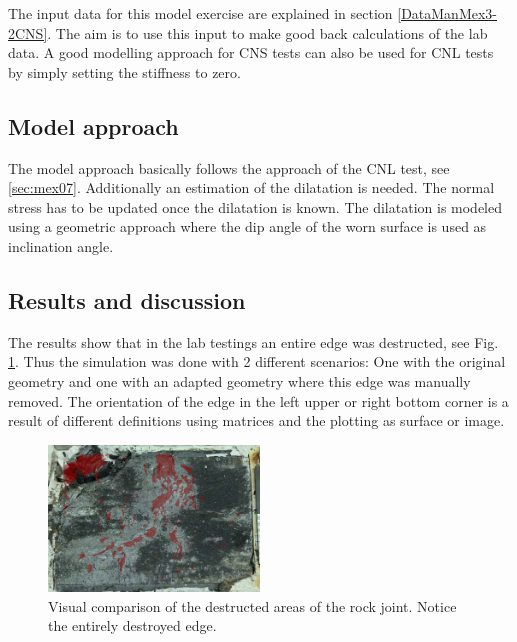 The input data for this model exercise are explained in section \ref{DataManMex3-2CNS}. The aim is to use this input to make good back calculations of the lab data. A good modelling approach for CNS tests can also be used for CNL tests by simply setting the stiffness to zero.

\subsection{Model approach}
The model approach basically follows the approach of the CNL test, see \ref{sec:mex07}.
%
Additionally an estimation of the dilatation is needed. The normal stress has to be updated once the dilatation is known. The dilatation is modeled using a geometric approach where the dip angle of the worn surface is used as inclination angle.

\subsection{Results and discussion}
The results show that in the lab testings an entire edge was destructed, see Fig. \ref{fig:MEX3-2_AbrasionPic}. Thus the simulation was done with 2 different scenarios: One with the original geometry and one with an adapted geometry where this edge was manually removed. The orientation of the edge in the left upper or right bottom corner is a result of different definitions using matrices and the plotting as surface or image.

\begin{figure}[!ht]
\begin{center}
\includegraphics[width=0.5\textwidth]{./figures/MEX3-2_AbrasionPicVsSim.PNG}
\end{center}
\caption{Visual comparison of the destructed areas of the rock joint. Notice the entirely destroyed edge.}
\label{fig:MEX3-2_AbrasionPic}
\end{figure}

